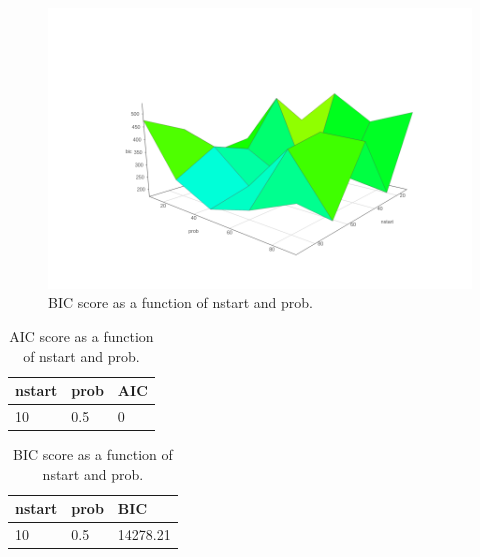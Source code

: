 \documentclass[12pt]{article}
\theoremstyle{definition}
\begin{document}
\begin{figure}[H]
    \centering
    \includegraphics[width=0.8\linewidth]{rough2.png}
    \caption{BIC score as a function of nstart and prob.}
\label{fig:rough}
\end{figure}


\begin{table}[h]
\centering
\begin{tabular}{lll}
    nstart & prob & AIC \\
    \hline \hline
    10 & 0.5  & 0 \\
\end{tabular}
\caption{AIC score as a function of nstart and prob.}
\label{table1}
\end{table}

\begin{table}[h]
\centering
\begin{tabular}{lll}
    nstart & prob & BIC \\
    \hline \hline
    10 & 0.5  & 14278.21 \\
\end{tabular}
\caption{BIC score as a function of nstart and prob.}
\label{table1}
\end{table}
\end{document}
